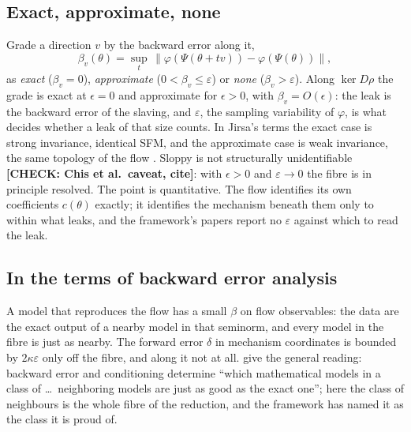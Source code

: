 \documentclass[10pt]{article}
\newcommand{\CHECK}[1]{\textcolor{purple!70!black}{\textbf{[CHECK: #1]}}}
\begin{document}
\subsection{Exact, approximate, none}
Grade a direction $v$ by the backward error along it,
\begin{equation}
\beta_v(\theta)=\sup_t\,\bigl\|\varphi(\Psi(\theta+tv))-\varphi(\Psi(\theta))\bigr\| ,
\label{eq:betav}
\end{equation}
as \emph{exact} ($\beta_v=0$), \emph{approximate} ($0<\beta_v\le\varepsilon$) or \emph{none} ($\beta_v>\varepsilon$). Along $\ker D\rho$ the grade is exact at $\epsilon=0$ and approximate for $\epsilon>0$, with $\beta_v=O(\epsilon)$: the leak is the backward error of the slaving, and $\varepsilon$, the sampling variability of $\varphi$, is what decides whether a leak of that size counts. In Jirsa's terms the exact case is strong invariance, identical SFM, and the approximate case is weak invariance, the same topology of the flow \parencite{jirsa2020}. Sloppy is not structurally unidentifiable \CHECK{Chis et al.\ caveat, cite}: with $\epsilon>0$ and $\varepsilon\to0$ the fibre is in principle resolved. The point is quantitative. The flow identifies its own coefficients $c(\theta)$ exactly; it identifies the mechanism beneath them only to within what leaks, and the framework's papers report no $\varepsilon$ against which to read the leak.

\subsection{In the terms of backward error analysis}
A model that reproduces the flow has a small $\beta$ on flow observables: the data are the exact output of a nearby model in that seminorm, and every model in the fibre is just as nearby. The forward error $\delta$ in mechanism coordinates is bounded by $2\kappa\varepsilon$ only off the fibre, and along it not at all. \textcite{fillion2018} give the general reading: backward error and conditioning determine ``which mathematical models in a class of \ldots\ neighboring models are just as good as the exact one''; here the class of neighbours is the whole fibre of the reduction, and the framework has named it as the class it is proud of.
\end{document}
